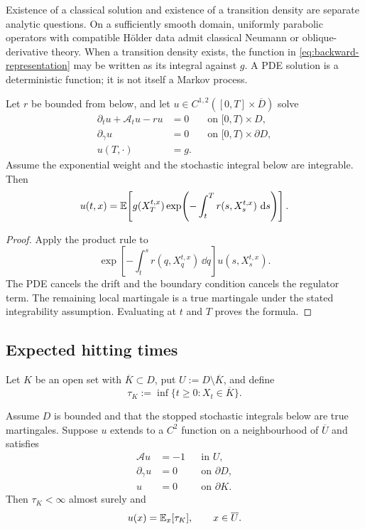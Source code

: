 \begin{remark}
Existence of a classical solution and existence of a transition density are
separate analytic questions. On a sufficiently smooth domain, uniformly
parabolic operators with compatible H\"older data admit classical Neumann or
oblique-derivative theory. When a transition density exists, the function in
\eqref{eq:backward-representation} may be written as its integral against
$g$. A PDE solution is a deterministic function; it is not itself a Markov
process.
\end{remark}

\begin{theorem}
Let $r$ be bounded from below, and let
$u\in C^{1,2}([0,T]\times\overline D)$ solve
\begin{align*}
  \partial_tu+\mathcal A_tu-r u&=0
      &&\text{on }[0,T)\times D,\\
  \partial_\gamma u&=0
      &&\text{on }[0,T)\times\partial D,\\
  u(T,\cdot)&=g.
\end{align*}
Assume the exponential weight and the stochastic integral below are
integrable. Then
\begin{equation}
  u(t,x)
  =\mathbb E\!\left[
      g(X_T^{t,x})
      \exp\!\left(
        -\int_t^T r(s,X_s^{t,x})\,\mathop{}\!\mathrm d s
      \right)
    \right]. \label{eq:feynman-kac-reflected}
\end{equation}
\end{theorem}

\begin{proof}
Apply the product rule to
\[
  \exp\!\left[
    -\int_t^s r(q,X_q^{t,x})\,\dd q
  \right]u(s,X_s^{t,x}).
\]
The PDE cancels the drift and the boundary condition cancels the regulator
term. The remaining local martingale is a true martingale under the stated
integrability assumption. Evaluating at $t$ and $T$ proves the formula.
\end{proof}

\subsection{Expected hitting times}

Let $K$ be an open set with $\overline K\subset D$, put
$U:=D\setminus\overline K$, and define
\[
  \tau_K:=\inf\{t\geq0:X_t\in\overline K\}.
\]

\begin{theorem}
Assume $D$ is bounded and that the stopped stochastic integrals below are
true martingales. Suppose $u$ extends to a $C^2$ function on a neighbourhood of
$\overline U$ and satisfies
\begin{align*}
  \mathcal Au&=-1 &&\text{in }U,\\
  \partial_\gamma u&=0 &&\text{on }\partial D,\\
  u&=0 &&\text{on }\partial K.
\end{align*}
Then $\tau_K<\infty$ almost surely and
\begin{equation}
  u(x)=\mathbb E_x[\tau_K],
  \qquad x\in\overline U. \label{eq:mean-hitting}
\end{equation}
\end{theorem}

